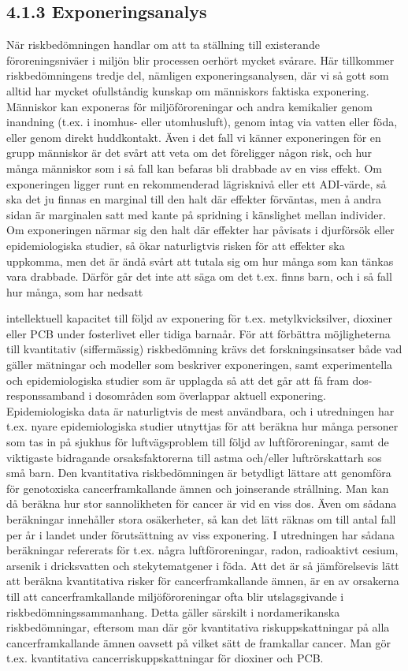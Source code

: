 \subsection*{4.1.3 Exponeringsanalys}
När riskbedömningen handlar om att ta ställning till existerande föroreningsniväer i miljön blir processen oerhört mycket svårare. Här tillkommer riskbedömningens tredje del, nämligen exponeringsanalysen, där vi så gott som alltid har mycket ofullståndig kunskap om människors faktiska exponering. Människor kan exponeras för miljöföroreningar och andra kemikalier genom inandning (t.ex. i inomhus- eller utomhusluft), genom intag via vatten eller föda, eller genom direkt huddkontakt. Även i det fall vi känner exponeringen för en grupp människor är det svårt att veta om det föreligger någon risk, och hur många människor som i så fall kan befaras bli drabbade av en viss effekt. Om exponeringen ligger runt en rekommenderad lägrisknivå eller ett ADI-värde, så ska det ju finnas en marginal till den halt där effekter förväntas, men å andra sidan är marginalen satt med kante på spridning i känslighet mellan individer. Om exponeringen närmar sig den halt där effekter har påvisats i djurförsök eller epidemiologiska studier, så ökar naturligtvis risken för att effekter ska uppkomma, men det är ändå svårt att tutala sig om hur många som kan tänkas vara drabbade. Därför går det inte att säga om det t.ex. finns barn, och i så fall hur många, som har nedsatt

intellektuell kapacitet till följd av exponering för t.ex. metylkvicksilver, dioxiner eller PCB under fosterlivet eller tidiga barnaår.
För att förbättra möjligheterna till kvantitativ (siffermässig) riskbedömning krävs det forskningsinsatser både vad gäller mätningar och modeller som beskriver exponeringen, samt experimentella och epidemiologiska studier som är upplagda så att det går att få fram dos-responssamband i dosområden som överlappar aktuell exponering. Epidemiologiska data är naturligtvis de mest användbara, och i utredningen har t.ex. nyare epidemiologiska studier utnyttjas för att beräkna hur många personer som tas in på sjukhus för luftvägsproblem till följd av luftföroreningar, samt de viktigaste bidragande orsaksfaktorerna till astma och/eller luftrörskattarh sos små barn.
Den kvantitativa riskbedömningen är betydligt lättare att genomföra för genotoxiska cancerframkallande ämnen och joinserande strållning. Man kan då beräkna hur stor sannolikheten för cancer är vid en viss dos. Även om sådana beräkningar innehåller stora osäkerheter, så kan det lätt räknas om till antal fall per år i landet under förutsättning av viss exponering. I utredningen har sådana beräkningar refererats för t.ex. några luftföroreningar, radon, radioaktivt cesium, arsenik i dricksvatten och stekytematgener i föda.
Att det är så jämförelsevis lätt att beräkna kvantitativa risker för cancerframkallande ämnen, är en av orsakerna till att cancerframkallande miljöföroreningar ofta blir utslagsgivande i riskbedömningssammanhang. Detta gäller särskilt i nordamerikanska riskbedömningar, eftersom man där gör kvantitativa riskuppskattningar på alla cancerframkallande ämnen oavsett på vilket sätt de framkallar cancer. Man gör t.ex. kvantitativa cancerriskuppskattningar för dioxiner och PCB.
